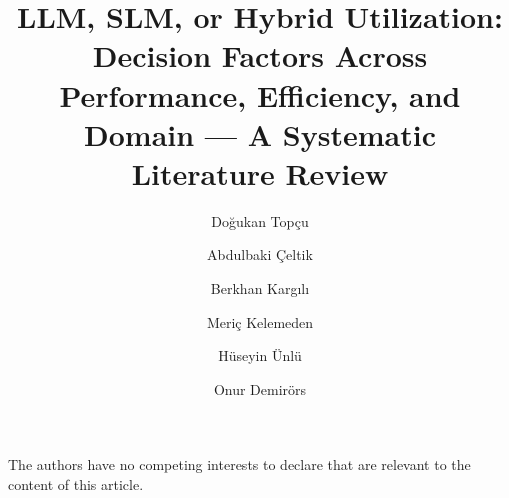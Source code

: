 \documentclass{llncs}
\begin{document}
\title{LLM, SLM, or Hybrid Utilization: Decision Factors Across Performance, Efficiency, and Domain — A Systematic Literature Review}

\author{Doğukan Topçu \and Abdulbaki Çeltik \and Berkhan Kargılı \and Meriç Kelemeden \and Hüseyin Ünlü \and Onur Demirörs}


\maketitle








\begin{credits}
\subsubsection{\discintname}
The authors have no competing interests to declare that are relevant to the content of this article.
\end{credits}

\appendix


\end{document}
